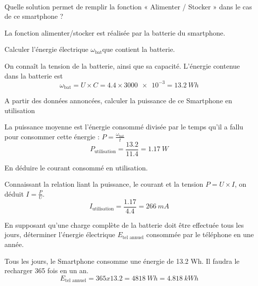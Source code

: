 \documentclass[10pt,fleqn]{article} %
\begin{document}
\begin{exercise}~

\begin{question}
  Quelle solution permet de remplir la fonction « Alimenter / Stocker » dans le cas de ce smartphone ?
\end{question}
\begin{solution}
  La fonction alimenter/stocker est réalisée par la batterie du smartphone.
\end{solution}

\begin{question}
  Calculer l’énergie électrique $\omega_\text{bat}$que contient la batterie.
\end{question}
\begin{solution}
  On connaît la tension de la batterie, ainsi que sa capacité. L'énergie
  contenue dans la batterie est $$\omega_\text{bat} = U\times C = 4.4 \times \num{3000e-3}=\SI{13.2}{Wh} $$
\end{solution}

\begin{question}
  A partir des données annoncées, calculer la puissance de ce Smartphone en
 utilisation
\end{question}
\begin{solution}
La puissance moyenne est l'énergie consommé divisée par le temps qu'il a fallu pour consommer cette énergie : $P = \frac{\omega_\text{bat}}{t}$
$$P_{\text{utilisation}} = \frac{13.2}{11.4} = \SI{1.17}{W}$$
\end{solution}

\begin{question}
  En déduire le courant consommé en utilisation.
\end{question}
\begin{solution}
  Connaissant la relation liant la puissance, le courant et la tension
  $P=U\times I$, on déduit $I = \frac{P}{U}$.
  $$I_{\text{utilisation}} = \frac{1.17}{4.4} = \SI{266}{mA}$$
\end{solution}

\begin{question}
  En supposant qu’une charge complète de la batterie doit être effectuée tous les jours, déterminer l’énergie électrique $E_{\text{tel annuel}}$ consommée par le téléphone en une année.
\end{question}
\begin{solution}
  Tous les jours, le Smartphone consomme une énergie de 13.2 Wh.
Il faudra le recharger 365 fois en un an.
$$E_{\text{tel annuel}} = 365 x 13.2 = \SI{4 818}{Wh} = \SI{4.818}{kWh}$$
\end{solution}


\end{exercise}
\end{document}
